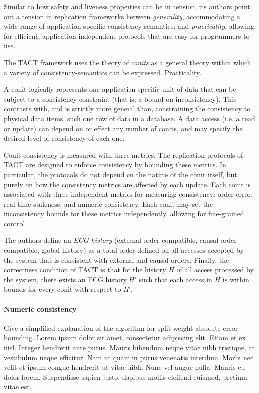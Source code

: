 Similar to how safety and liveness properties can be in tension, its
authors point out a tension in replication frameworks between
\emph{generality}, accommodating a wide range of application-specific
consistency semantics; and \emph{practicality}, allowing for
efficient, application-independent protocols that are easy for
programmers to use.

The TACT framework uses the theory of
\emph{conits} as a general theory within which a variety of
consistency-semantics can be expressed. Practicality.

A conit logically represents one application-specific unit of data
that can be subject to a consistency constraint (that is, a bound on
inconsistency). This contrasts with, and is strictly more general
than, constraining the consistency to physical data items, such one
row of data in a database. A data access (i.e. a read or update) can
depend on or effect any number of conits, and may specify the desired
level of consistency of each one.

Conit consistency is measured with three metrics. The replication
protocols of TACT are designed to enforce consistency by bounding
these metrics. In particular, the protocols do not depend on the
nature of the conit itself, but purely on how the consistency metrics
are affected by each update. Each conit is associated with three
independent metrics for measuring consistency: order error, real-time
staleness, and numeric consistency. Each conit may set the
inconsistency bounds for these metrics independently, allowing for
fine-grained control.

The authors define an \emph{ECG history} (external-order compatible,
causal-order compatible, global history) as a total order defined on
all accesses accepted by the system that is consistent with external
and causal orders. Finally, the correctness condition of TACT is that
for the history $H$ of all access processed by the system, there
exists an ECG history $H'$ such that each access in $H$ is within
bounds for every conit with respect to $H'$.

\paragraph{Numeric consistency}

Give a simplified explanation of the algorithm for split-weight
absolute error bounding. Lorem ipsum dolor sit amet, consectetur
adipiscing elit. Etiam et ex nisl. Integer hendrerit ante
purus. Mauris bibendum neque vitae nibh tristique, at vestibulum neque
efficitur. Nam ut quam in purus venenatis interdum. Morbi nec velit et
ipsum congue hendrerit ut vitae nibh. Nunc vel augue nulla. Mauris eu
dolor lorem. Suspendisse sapien justo, dapibus mollis eleifend
euismod, pretium vitae est.

